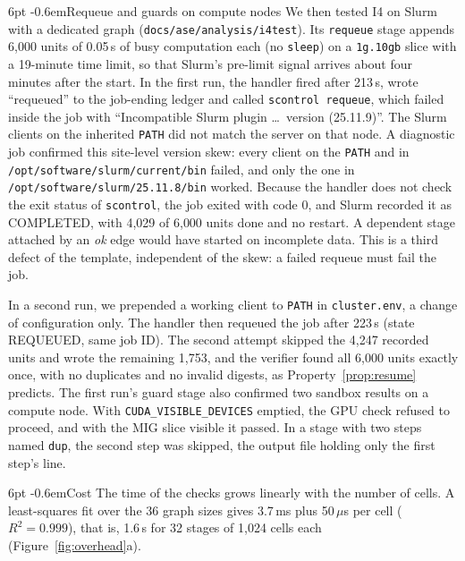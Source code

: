 \documentclass[pdflatex,sn-mathphys-num]{sn-jnl}
\makeatletter
\theoremstyle{thmstyletwo}%
\theoremstyle{thmstylethree}%
\newcommand{\code}[1]{\texttt{#1}}
\newcommand{\I}[1]{\textsf{I#1}}
\renewcommand\paragraph{\@startsection{paragraph}{4}{\z@}%
  {6pt \@plus 2pt \@minus 1pt}{-0.6em}{\normalfont\normalsize\bfseries}}
\makeatother
\begin{document}
\paragraph{Requeue and guards on compute nodes} We then tested \I{4} on Slurm with a dedicated graph (\code{docs/ase/analysis/i4test}). Its \code{requeue} stage appends 6{,}000 units of 0.05\,s of busy computation each (no \code{sleep}) on a \code{1g.10gb} slice with a 19-minute time limit, so that Slurm's pre-limit signal arrives about four minutes after the start. In the first run, the handler fired after 213\,s, wrote ``requeued'' to the job-ending ledger and called \code{scontrol requeue}, which failed inside the job with ``Incompatible Slurm plugin \ldots\ version (25.11.9)''. The Slurm clients on the inherited \code{PATH} did not match the server on that node. A diagnostic job confirmed this site-level version skew: every client on the \code{PATH} and in \code{/opt/software/slurm/current/bin} failed, and only the one in \code{/opt/software/slurm/25.11.8/bin} worked. Because the handler does not check the exit status of \code{scontrol}, the job exited with code 0, and Slurm recorded it as COMPLETED, with 4{,}029 of 6{,}000 units done and no restart. A dependent stage attached by an \emph{ok} edge would have started on incomplete data. This is a third defect of the template, independent of the skew: a failed requeue must fail the job.

In a second run, we prepended a working client to \code{PATH} in \code{cluster.env}, a change of configuration only. The handler then requeued the job after 223\,s (state REQUEUED, same job ID). The second attempt skipped the 4{,}247 recorded units and wrote the remaining 1{,}753, and the verifier found all 6{,}000 units exactly once, with no duplicates and no invalid digests, as Property~\ref{prop:resume} predicts. The first run's guard stage also confirmed two sandbox results on a compute node. With \code{CUDA\_VISIBLE\_DEVICES} emptied, the GPU check refused to proceed, and with the MIG slice visible it passed. In a stage with two steps named \code{dup}, the second step was skipped, the output file holding only the first step's line.

\paragraph{Cost} The time of the checks grows linearly with the number of cells. A least-squares fit over the 36 graph sizes gives 3.7\,ms plus 50\,$\mu$s per cell ($R^2=0.999$), that is, 1.6\,s for 32 stages of 1{,}024 cells each (Figure~\ref{fig:overhead}a).
\end{document}
